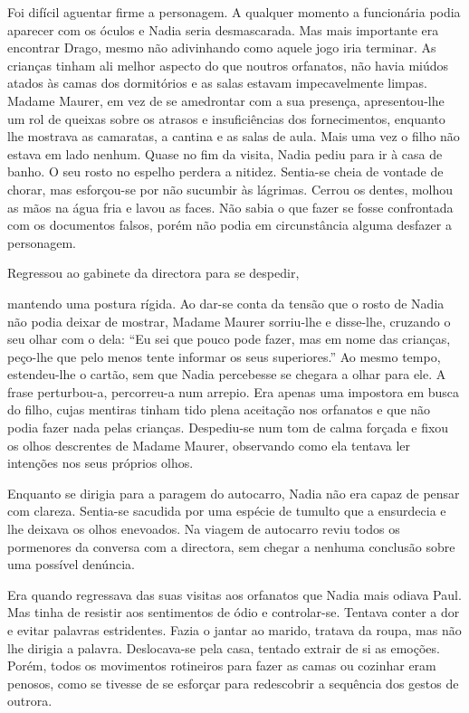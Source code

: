 Foi difícil aguentar firme a personagem. A qualquer momento a
funcionária podia aparecer com os óculos e Nadia seria desmascarada. Mas
mais importante era encontrar Drago, mesmo não adivinhando como aquele
jogo iria terminar. As crianças tinham ali melhor aspecto do que noutros
orfanatos, não havia miúdos atados às camas dos dormitórios e as salas
estavam impecavelmente limpas. Madame Maurer, em vez de se amedrontar
com a sua presença, apresentou-lhe um rol de queixas sobre os atrasos e
insuficiências dos fornecimentos, enquanto lhe mostrava as camaratas, a
cantina e as salas de aula. Mais uma vez o filho não estava em lado
nenhum. Quase no fim da visita, Nadia pediu para ir à casa de banho. O
seu rosto no espelho perdera a nitidez. Sentia-se cheia de vontade de
chorar, mas esforçou-se por não sucumbir às lágrimas. Cerrou os dentes,
molhou as mãos na água fria e lavou as faces. Não sabia o que fazer se
fosse confrontada com os documentos falsos, porém não podia em
circunstância alguma desfazer a personagem.

Regressou ao gabinete da directora para se despedir,

mantendo uma postura rígida. Ao dar-se conta da tensão que o rosto de
Nadia não podia deixar de mostrar, Madame Maurer sorriu-lhe e disse-lhe,
cruzando o seu olhar com o dela: ``Eu sei que pouco pode fazer, mas em
nome das crianças, peço-lhe que pelo menos tente informar os seus
superiores.'' Ao mesmo tempo, estendeu-lhe o cartão, sem que Nadia
percebesse se chegara a olhar para ele. A frase perturbou-a, percorreu-a
num arrepio. Era apenas uma impostora em busca do filho, cujas mentiras
tinham tido plena aceitação nos orfanatos e que não podia
fazer nada pelas crianças. Despediu-se num tom de calma forçada e fixou
os olhos descrentes de Madame Maurer, observando como ela tentava ler
intenções nos seus próprios olhos.

Enquanto se dirigia para a paragem do autocarro, Nadia não era capaz de
pensar com clareza. Sentia-se sacudida por uma espécie de tumulto que a
ensurdecia e lhe deixava os olhos enevoados. Na viagem de autocarro
reviu todos os pormenores da conversa com a directora, sem chegar a
nenhuma conclusão sobre uma possível denúncia.

Era quando regressava das suas visitas aos orfanatos que Nadia mais
odiava Paul. Mas tinha de resistir aos sentimentos de ódio e
controlar-se. Tentava conter a dor e evitar palavras estridentes. Fazia
o jantar ao marido, tratava da roupa, mas não lhe dirigia a palavra.
Deslocava-se pela casa, tentado extrair de si as emoções. Porém, todos
os movimentos rotineiros para fazer as camas ou cozinhar eram penosos,
como se tivesse de se esforçar para redescobrir a sequência dos gestos
de outrora.

